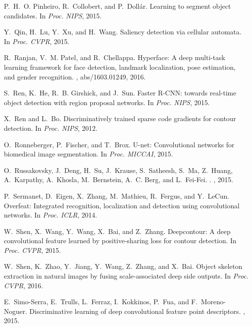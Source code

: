 \documentclass[10pt,twocolumn,letterpaper]{article}
\begin{document}
\begin{thebibliography}{100}
	P.~H.~O. Pinheiro, R.~Collobert, and P.~Doll{\'{a}}r.
	\newblock Learning to segment object candidates.
	\newblock In {\em Proc. {NIPS}}, 2015.
	
	Y.~Qin, H.~Lu, Y.~Xu, and H.~Wang.
	\newblock Saliency detection via cellular automata.
	\newblock In {\em Proc. {CVPR}}, 2015.
	
	R.~Ranjan, V.~M. Patel, and R.~Chellappa.
	\newblock Hyperface: {A} deep multi-task learning framework for face detection,
	landmark localization, pose estimation, and gender recognition.
	, abs/1603.01249, 2016.
	
	S.~Ren, K.~He, R.~B. Girshick, and J.~Sun.
	\newblock Faster {R-CNN:} towards real-time object detection with region
	proposal networks.
	\newblock In {\em Proc. {NIPS}}, 2015.
	
	X.~Ren and L.~Bo.
	\newblock Discriminatively trained sparse code gradients for contour detection.
	\newblock In {\em Proc. {NIPS}}, 2012.
	
	O.~Ronneberger, P.~Fischer, and T.~Brox.
	\newblock U-net: Convolutional networks for biomedical image segmentation.
	\newblock In {\em Proc. MICCAI}, 2015.
	
	O.~Russakovsky, J.~Deng, H.~Su, J.~Krause, S.~Satheesh, S.~Ma, Z.~Huang,
	A.~Karpathy, A.~Khosla, M.~Bernstein, A.~C. Berg, and L.~Fei-Fei.
	.
	, 2015.
	
	P.~Sermanet, D.~Eigen, X.~Zhang, M.~Mathieu, R.~Fergus, and Y.~LeCun.
	\newblock Overfeat: Integrated recognition, localization and detection using
	convolutional networks.
	\newblock In {\em Proc. {ICLR}}, 2014.
	
	W.~Shen, X.~Wang, Y.~Wang, X.~Bai, and Z.~Zhang.
	\newblock Deepcontour: A deep convolutional feature learned by positive-sharing
	loss for contour detection.
	\newblock In {\em Proc. {CVPR}}, 2015.
	
	W.~Shen, K.~Zhao, Y.~Jiang, Y.~Wang, Z.~Zhang, and X.~Bai.
	\newblock Object skeleton extraction in natural images by fusing
	scale-associated deep side outputs.
	\newblock In {\em Proc. {CVPR}}, 2016.
	
	E.~Simo-Serra, E.~Trulls, L.~Ferraz, I.~Kokkinos, P.~Fua, and F.~Moreno-Noguer.
	\newblock Discriminative learning of deep convolutional feature point
	descriptors.
	, 2015.
	

\end{thebibliography}
\end{document}
